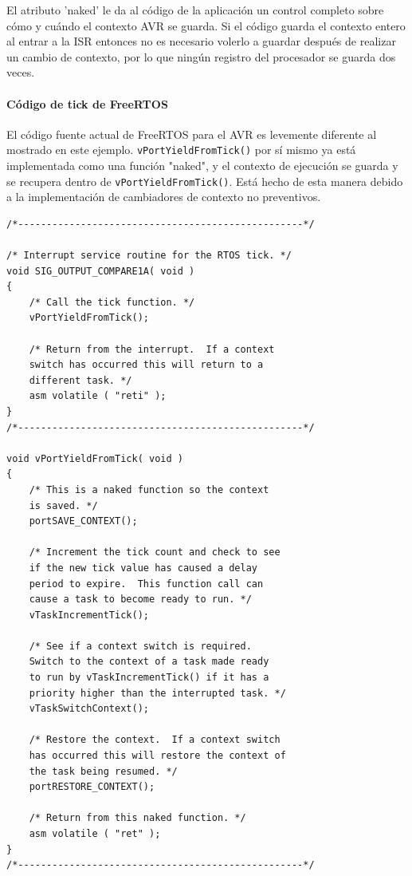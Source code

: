El atributo 'naked' le da al código de la aplicación un control completo sobre cómo y cuándo el contexto AVR se guarda. Si el código guarda el contexto entero al entrar a la ISR entonces no es necesario volerlo a guardar después de realizar un cambio de contexto, por lo que ningún registro del procesador se guarda dos veces. 

\paragraph{Código de tick de FreeRTOS}


El código fuente actual de FreeRTOS para el AVR es levemente diferente al mostrado en este ejemplo. \texttt{vPortYieldFromTick()} por sí mismo ya está implementada como una función "naked", y el contexto de ejecución se guarda y se recupera dentro de \texttt{vPortYieldFromTick()}. Está hecho de esta manera debido a la implementación de cambiadores de contexto no preventivos. 

\begin{verbatim}
/*--------------------------------------------------*/

/* Interrupt service routine for the RTOS tick. */
void SIG_OUTPUT_COMPARE1A( void )
{
    /* Call the tick function. */
    vPortYieldFromTick();

    /* Return from the interrupt.  If a context
    switch has occurred this will return to a 
    different task. */
    asm volatile ( "reti" );
}
/*--------------------------------------------------*/

void vPortYieldFromTick( void )
{
    /* This is a naked function so the context
    is saved. */
    portSAVE_CONTEXT();

    /* Increment the tick count and check to see
    if the new tick value has caused a delay
    period to expire.  This function call can
    cause a task to become ready to run. */
    vTaskIncrementTick();

    /* See if a context switch is required.  
    Switch to the context of a task made ready
    to run by vTaskIncrementTick() if it has a
    priority higher than the interrupted task. */
    vTaskSwitchContext();

    /* Restore the context.  If a context switch
    has occurred this will restore the context of
    the task being resumed. */
    portRESTORE_CONTEXT();

    /* Return from this naked function. */
    asm volatile ( "ret" );
}
/*--------------------------------------------------*/
\end{verbatim}

